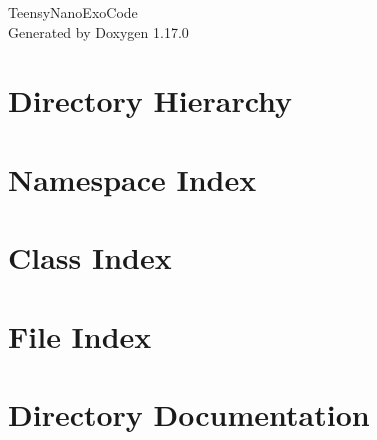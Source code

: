 \documentclass[twoside]{book}
\newcommand{\+}{\discretionary{\mbox{\scriptsize$\hookleftarrow$}}{}{}}
\newcommand{\clearemptydoublepage}{%
    \newpage{\pagestyle{empty}\cleardoublepage}%
  }
\begin{document}
  \raggedbottom
    \hypersetup{pageanchor=false,
                bookmarksnumbered=true,
                pdfencoding=unicode
               }
  \begin{titlepage}
  \vspace*{7cm}
  \begin{center}%
  {\Large Teensy\+Nano\+Exo\+Code}\\
  \vspace*{1cm}
  {\large Generated by Doxygen 1.17.0}\\
  \end{center}
  \end{titlepage}
  \clearemptydoublepage
  \tableofcontents
  \clearemptydoublepage
  \hypersetup{pageanchor=true}
\chapter{Directory Hierarchy}

\chapter{Namespace Index}

\chapter{Class Index}

\chapter{File Index}

\chapter{Directory Documentation}


\end{document}
